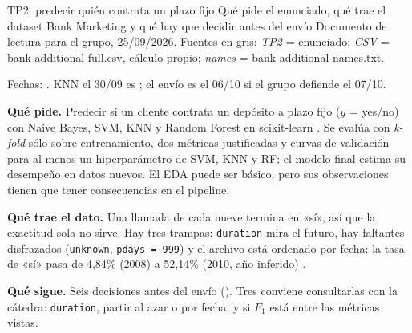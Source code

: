 \documentclass[10pt,a4paper]{article}
\begin{document}
  {TP2: predecir quién contrata un plazo fijo}
  {Qué pide el enunciado, qué trae el dataset Bank Marketing y qué hay que decidir antes del envío}
  {Documento de lectura para el grupo, 25/09/2026. Fuentes en gris: \textit{TP2} = enunciado;
  \textit{CSV} = bank-additional-full.csv, cálculo propio; \textit{names} = bank-additional-names.txt.}

{\footnotesize\color{apagado} Fechas: . KNN el 30/09 es ; el envío es el 06/10 si el grupo defiende el 07/10.}

\begin{cifras}[4]
\end{cifras}

\resumen
\textbf{Qué pide.} Predecir si un cliente contrata un depósito a plazo fijo ($y$ = yes/no) con
Naive Bayes, SVM, KNN y Random Forest en scikit-learn . Se evalúa con
\textit{k-fold} sólo sobre entrenamiento, dos métricas justificadas y curvas de validación para al
menos un hiperparámetro de SVM, KNN y RF; el modelo final estima su desempeño en datos nuevos. El
EDA puede ser básico, pero sus observaciones tienen que tener consecuencias en el pipeline.

\textbf{Qué trae el dato.} Una llamada de cada nueve termina en «sí», así que la exactitud sola
no sirve. Hay tres trampas: \texttt{duration}
mira el futuro, hay faltantes disfrazados (\texttt{unknown}, \texttt{pdays = 999}) y el archivo está
ordenado por fecha: la tasa de «sí» pasa de 4,84\% (2008) a 52,14\% (2010, año inferido) .

\textbf{Qué sigue.} Seis decisiones antes del envío (). Tres conviene consultarlas
con la cátedra: \texttt{duration}, partir al azar o por fecha, y si $F_1$ está entre las métricas vistas.

\end{document}
